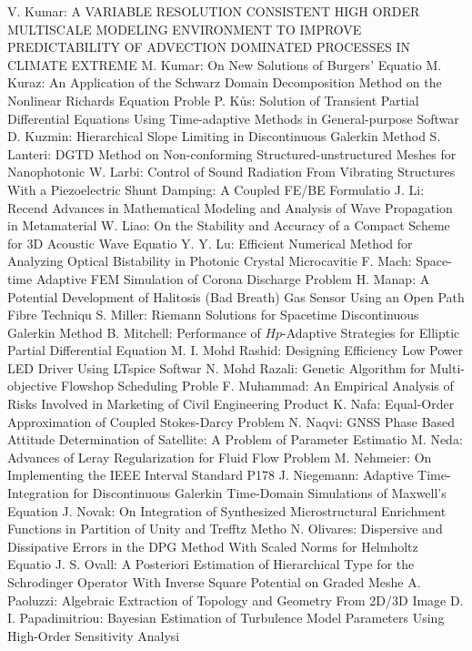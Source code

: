 \documentclass[10pt, A4]{article}%
\begin{document}
{V. Kumar}: {A VARIABLE RESOLUTION CONSISTENT HIGH ORDER MULTISCALE MODELING ENVIRONMENT TO IMPROVE PREDICTABILITY OF ADVECTION DOMINATED PROCESSES IN CLIMATE EXTREME}
{M. Kumar}: {On New Solutions of Burgers' Equatio}
{M. Kuraz}: {An Application of the Schwarz Domain Decomposition Method on the Nonlinear Richards Equation Proble}
{P. Kůs}: {Solution of Transient Partial Differential Equations Using Time-adaptive Methods in General-purpose Softwar}
{D. Kuzmin}: {Hierarchical Slope Limiting in  Discontinuous Galerkin Method}
{S. Lanteri}: {DGTD  Method  on  Non-conforming  Structured-unstructured  Meshes  for Nanophotonic}
{W. Larbi}: {Control of Sound Radiation From Vibrating Structures With a Piezoelectric Shunt Damping: A Coupled FE/BE Formulatio}
{J. Li}: {Recend Advances in Mathematical Modeling and Analysis of Wave Propagation in Metamaterial}
{W. Liao}: {On the Stability and Accuracy of a Compact Scheme for 3D Acoustic Wave Equatio}
{Y. Y. Lu}: {Efficient Numerical Method for Analyzing Optical Bistability in Photonic Crystal Microcavitie}
{F. Mach}: {Space-time Adaptive FEM Simulation of Corona Discharge Problem}
{H. Manap}: {A Potential Development of Halitosis (Bad Breath) Gas Sensor Using an Open Path Fibre Techniqu}
{S. Miller}: {Riemann Solutions for Spacetime Discontinuous Galerkin Method}
{B. Mitchell}: {Performance of $Hp$-Adaptive Strategies for Elliptic Partial Differential Equation}
{M. I. Mohd Rashid}: {Designing Efficiency Low Power LED Driver Using LTspice Softwar}
{N. Mohd Razali}: {Genetic Algorithm for Multi-objective Flowshop Scheduling Proble}
{F. Muhammad}: {An Empirical Analysis of Risks Involved in Marketing of Civil Engineering Product}
{K. Nafa}: {Equal-Order Approximation of Coupled Stokes-Darcy Problem}
{N. Naqvi}: {GNSS Phase Based Attitude Determination of Satellite: A Problem of Parameter Estimatio}
{M. Neda}: {Advances of Leray Regularization for Fluid Flow Problem}
{M. Nehmeier}: {On Implementing  the IEEE Interval Standard P178}
{J. Niegemann}: {Adaptive Time-Integration for Discontinuous Galerkin Time-Domain Simulations of Maxwell's Equation}
{J. Novak}: {On Integration of Synthesized Microstructural Enrichment Functions in Partition of Unity and Trefftz Metho}
{N. Olivares}: {Dispersive and Dissipative Errors in the DPG Method With Scaled Norms for Helmholtz Equatio}
{J. S. Ovall}: {A Posteriori Estimation of Hierarchical Type for the  Schrodinger Operator With Inverse Square Potential on Graded Meshe}
{A. Paoluzzi}: {Algebraic Extraction of Topology and Geometry From 2D/3D Image}
{D. I. Papadimitriou}: {Bayesian Estimation of Turbulence Model Parameters Using High-Order Sensitivity Analysi}
\end{document}
